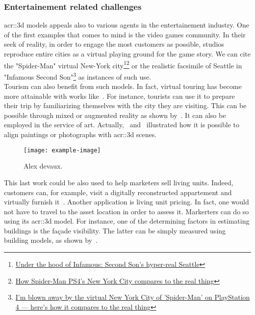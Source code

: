         \subsubsection{Entertainement related challenges}
            \gls{acr::3d} models appeals also to various agents in the entertainement industry. 
            One of the first examples that comes to mind is the video games community. 
            In their seek of reality, in order to engage the most customers as possible, studios reproduce entire cities as a virtual playing ground for the game story. 
            We can cite the "Spider-Man" virtual New-York city\footnote{
                \href{https://www.polygon.com/2013/9/25/4702318/under-the-hood-of-infamous-second-son-hyper-real-seattle}{Under the hood of Infamous: Second Son's hyper-real Seattle}
            }\footnote{
                \href{https://www.polygon.com/e3/2018/6/12/17453588/spider-man-ps4-new-york-city-avengers-demo-preview}{How Spider-Man PS4’s New York City compares to the real thing}
            } or the realistic facsimile of Seattle in "Infamous Second Son"\footnote{
                \href{http://www.businessinsider.fr/us/spider-man-ps4-new-york-city-2018-9}{I'm blown away by the virtual New York City of 'Spider-Man' on PlayStation 4 — here's how it compares to the real thing}
            } as instances of such use.\\
            Tourism can also benefit from such models. 
            In fact, virtual touring has become more attainable with works like~\textcite{koutsoudis20073d}. 
            For instance, tourists can use it to prepare their trip by familiarizing themselves with the city they are visiting. 
            This can be possible through mixed or augmented reality as shown by~\textcite{devaux20183d}. 
            It can also be employed in the service of art. 
            Actually,~\textcite{aubry2014painting} and~\textcite{russell2011automatic} illustrated how it is possible to align paintings or photographs with \gls{acr::3d} scenes.\\
            \begin{figure}[htpb]
                \centering
                \texttt{[image: example-image]}             
                \caption{
                    \label{fig::augemented_reality} Alex devaux. 
                }
            \end{figure}
            This last work could be also used to help marketers sell living units. 
            Indeed, customers can, for example, visit a digitally reconstructed appartement and virtually furnish it~\parencite{kim2019planar}.
            Another application is living unit pricing.
            In fact, one would not have to travel to the asset location in order to assess it. 
            Markerters can do so using its \gls{acr::3d} model. 
            For instance, one of the determining factors in estimating buildings is the fa\c{c}ade visibility. 
            The latter can be simply measured using building models, as shown by~\textcite{albrecht2013assessing}. 

